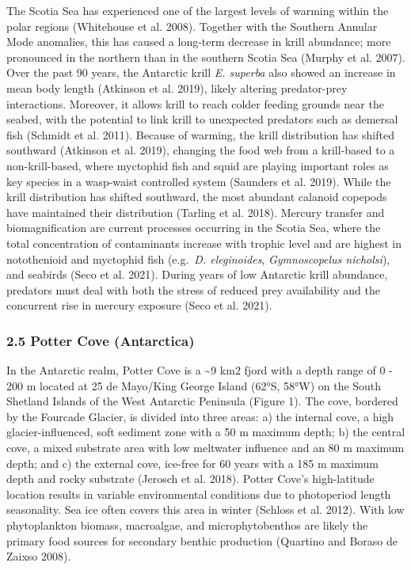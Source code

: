 \documentclass[
]{article}
\begin{document}
The Scotia Sea has experienced one of the largest levels of warming
within the polar regions (Whitehouse et al. 2008). Together with the
Southern Annular Mode anomalies, this has caused a long-term decrease in
krill abundance; more pronounced in the northern than in the southern
Scotia Sea (Murphy et al. 2007). Over the past 90 years, the Antarctic
krill \emph{E. superba} also showed an increase in mean body length
(Atkinson et al. 2019), likely altering predator-prey interactions.
Moreover, it allows krill to reach colder feeding grounds near the
seabed, with the potential to link krill to unexpected predators such as
demersal fish (Schmidt et al. 2011). Because of warming, the krill
distribution has shifted southward (Atkinson et al. 2019), changing the
food web from a krill-based to a non-krill-based, where myctophid fish
and squid are playing important roles as key species in a wasp-waist
controlled system (Saunders et al. 2019). While the krill distribution
has shifted southward, the most abundant calanoid copepods have
maintained their distribution (Tarling et al. 2018). Mercury transfer
and biomagnification are current processes occurring in the Scotia Sea,
where the total concentration of contaminants increase with trophic
level and are highest in notothenioid and myctophid fish (e.g.~\emph{D.
eleginoides}, \emph{Gymnoscopelus nicholsi}), and seabirds (Seco et al.
2021). During years of low Antarctic krill abundance, predators must
deal with both the stress of reduced prey availability and the
concurrent rise in mercury exposure (Seco et al. 2021).

\subsubsection{2.5 Potter Cove
(Antarctica)}\label{potter-cove-antarctica}

In the Antarctic realm, Potter Cove is a \textasciitilde9 km2 fjord with
a depth range of 0 - 200 m located at 25 de Mayo/King George Island
(62°S, 58°W) on the South Shetland Islands of the West Antarctic
Peninsula (Figure 1). The cove, bordered by the Fourcade Glacier, is
divided into three areas: a) the internal cove, a high
glacier-influenced, soft sediment zone with a 50 m maximum depth; b) the
central cove, a mixed substrate area with low meltwater influence and an
80 m maximum depth; and c) the external cove, ice-free for 60 years with
a 185 m maximum depth and rocky substrate (Jerosch et al. 2018). Potter
Cove's high-latitude location results in variable environmental
conditions due to photoperiod length seasonality. Sea ice often covers
this area in winter (Schloss et al. 2012). With low phytoplankton
biomass, macroalgae, and microphytobenthos are likely the primary food
sources for secondary benthic production (Quartino and Boraso de Zaixso
2008).
\end{document}
